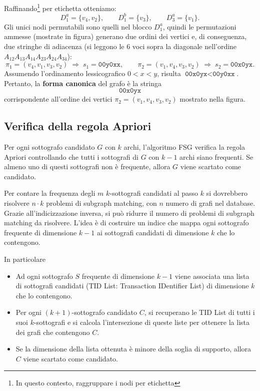 \noindent
Raffinando\footnote{In questo contesto, raggruppare i nodi per etichetta} per etichetta otteniamo:
\[
D_1^a=\{v_4,v_2\},\qquad D_1^b=\{v_3\},\qquad D_3^a=\{v_1\}.
\]
Gli unici nodi permutabili sono quelli nel blocco $D_1^a$, quindi le
permutazioni ammesse (mostrate in figura) generano due ordini dei vertici e,
di conseguenza, due stringhe di adiacenza (si leggono le
$6$ voci sopra la diagonale nell’ordine $A_{12}A_{13}A_{14}A_{23}A_{24}A_{34}$):
\[
\pi_1=(v_4,v_1,v_3,v_2)\;\Rightarrow\; s_1=\texttt{00y0xx},\qquad
\pi_2=(v_1,v_4,v_3,v_2)\;\Rightarrow\; s_2=\texttt{00x0yx}.
\]
Assumendo l’ordinamento lessicografico $0<x<y$, risulta
$\texttt{00x0yx}<\texttt{00y0xx}$. 
Pertanto, la \textbf{forma canonica} del grafo è la stringa
\[
\boxed{\texttt{00x0yx}}
\]
corrispondente all’ordine dei vertici $\pi_2=(v_1,v_4,v_3,v_2)$ mostrato nella figura.

\subsection{Verifica della regola Apriori}
Per ogni sottografo candidato $G$ con $k$ archi, l'algoritmo FSG verifica la regola Apriori controllando che tutti i sottografi di $G$ con $k-1$ archi siano frequenti. Se almeno uno di questi sottografi non è frequente, allora $G$ viene scartato come candidato.

Per contare la frequenza degli $m$ $k$-sottografi candidati al passo $k$ si dovrebbero risolvere $n \cdot k$ problemi di subgraph matching, con $n$ numero di grafi nel database. Grazie all'indicizzazione inversa, si può ridurre il numero di problemi di subgraph matching da risolvere. L'idea è di costruire un indice che mappa ogni sottografo frequente di dimensione $k-1$ ai sottografi candidati di dimensione $k$ che lo contengono. 

\noindent
In particolare
\begin{itemize}
    \item Ad ogni sottografo $S$ frequente di dimensione $k-1$ viene associata una lista di sottografi candidati (TID List: Transaction IDentifier List) di dimensione $k$ che lo contengono.
    \item Per ogni $(k+1)$-sottografo candidato $C$, si recuperano le TID List di tutti i suoi $k$-sottografi e si calcola l'intersezione di queste liste per ottenere la lista dei grafi che contengono $C$.
    \item Se la dimensione della lista ottenuta è minore della soglia di supporto, allora $C$ viene scartato come candidato.
\end{itemize}

